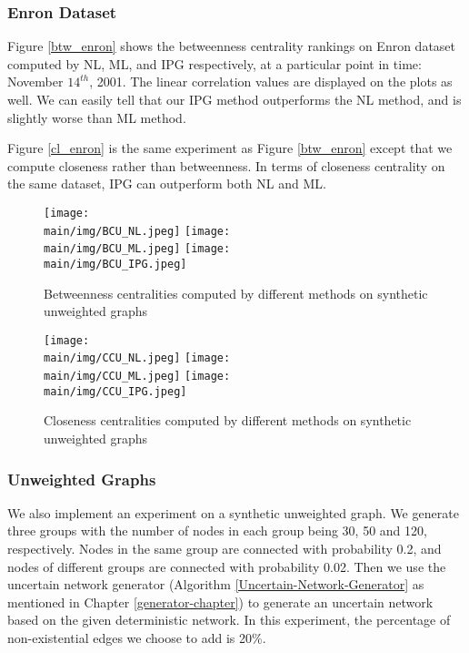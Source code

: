 \documentclass[\main/thesis.tex]{subfiles}
\begin{document}
\subsubsection{Enron Dataset}
Figure \ref{btw_enron} shows the betweenness centrality rankings on Enron dataset computed by NL, ML, and IPG respectively, at a particular point in time: November $14^{th}$, 2001. The linear correlation values are displayed on the plots as well. We can easily tell that our IPG method outperforms the NL method, and is slightly worse than ML method.

Figure \ref{cl_enron} is the same experiment as Figure \ref{btw_enron} except that we compute closeness rather than betweenness. In terms of closeness centrality on the same dataset, IPG can outperform both NL and ML.

\begin{figure}
\texttt{[image: \\main/img/BCU\_NL.jpeg]}
\texttt{[image: \\main/img/BCU\_ML.jpeg]}
\centering
\texttt{[image: \\main/img/BCU\_IPG.jpeg]}
\caption{Betweenness centralities computed by different methods on synthetic unweighted graphs}
\label{btw_unweighted}
\end{figure}

\begin{figure}
\texttt{[image: \\main/img/CCU\_NL.jpeg]}
\texttt{[image: \\main/img/CCU\_ML.jpeg]}
\centering
\texttt{[image: \\main/img/CCU\_IPG.jpeg]}
\caption{Closeness centralities computed by different methods on synthetic unweighted graphs}
\label{cl_unweighted}
\end{figure}

\subsubsection{Unweighted Graphs} \label{Unweighted-Graphs-Experiment}

We also implement an experiment on a synthetic unweighted graph. We generate three groups with the number of nodes in each group being 30, 50 and 120, respectively. Nodes in the same group are connected with probability 0.2, and nodes of different groups are connected with probability 0.02. Then we use the uncertain network generator (Algorithm \ref{Uncertain-Network-Generator} as mentioned in Chapter \ref{generator-chapter}) to generate an uncertain network based on the given deterministic network. In this experiment, the percentage of non-existential edges we choose to add is 20\%.
\end{document}
